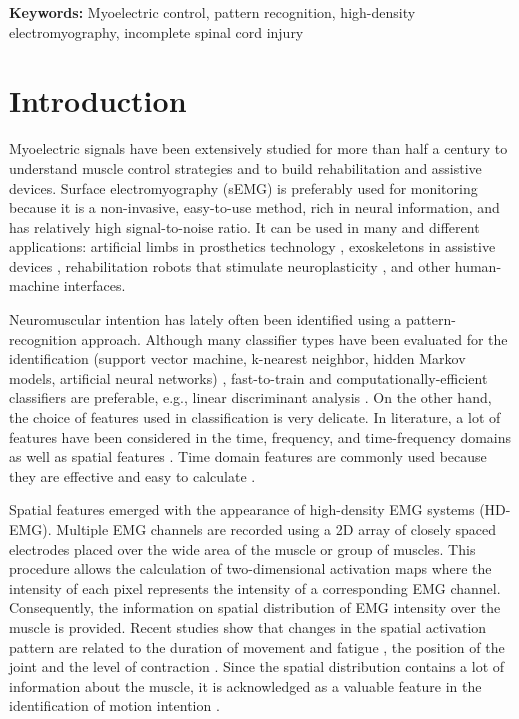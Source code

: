 \textbf{Keywords:} Myoelectric control, pattern recognition, high-density electromyography, incomplete spinal cord injury

\section{Introduction}
Myoelectric signals have been extensively studied for more than half a century to understand muscle control strategies and to build rehabilitation and assistive devices. Surface electromyography (sEMG) is preferably used for monitoring because it is a non-invasive, easy-to-use method, rich in neural information, and has relatively high signal-to-noise ratio. It can be used in many and different applications: artificial limbs in prosthetics technology \citep{Li2010, Huang2005}, exoskeletons in assistive devices \citep{Young2013}, rehabilitation robots that stimulate neuroplasticity \citep{Marchal-Crespo2009, Dipietro2005}, and other human-machine interfaces.

Neuromuscular intention has lately often been identified using a pattern-recognition approach. Although many classifier types have been evaluated for the identification (support vector machine, k-nearest neighbor, hidden Markov models, artificial neural networks) \citep{Oskoei2007}, fast-to-train and computationally-efficient classifiers are preferable, e.g., linear discriminant analysis \citep{Hakonen2015, Hargrove2007}. On the other hand, the choice of features used in classification is very delicate. In literature, a lot of features have been considered in the time, frequency, and time-frequency domains as well as spatial features \citep{Hakonen2015}. Time domain features are commonly used because they are effective and easy to calculate \citep{Hakonen2015}.

Spatial features emerged with the appearance of high-density EMG systems (HD-EMG). Multiple EMG channels are recorded using a 2D array of closely spaced electrodes placed over the wide area of the muscle or group of muscles. This procedure allows the calculation of two-dimensional activation maps where the intensity of each pixel represents the intensity of a corresponding EMG channel. Consequently, the information on spatial distribution of EMG intensity over the muscle is provided. Recent studies show that changes in the spatial activation pattern are related to the duration of movement and fatigue \citep{Tucker2009, Staudenmann2014}, the position of the joint \citep{Vieira2010} and the level of contraction \citep{Holtermann2005}. Since the spatial distribution contains a lot of information about the muscle, it is acknowledged as a valuable feature in the identification of motion intention \citep{Hakonen2015, Stango2015, Rojas-Martinez2013}.

